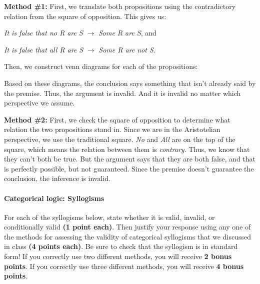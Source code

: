 \documentclass[10pt]{article}
\begin{document}
\begin{enumerate}
   \textbf{Method \#1:} First, we translate both propositions using the contradictory relation from the square of opposition. This gives us: 
  
  \textit{It is false that no R are S} $\rightarrow$ \textit{Some R are S}, and 
  
  \textit{It is false that all R are S} $\rightarrow$ \textit{Some R are not S}.
  
  Then, we construct venn diagrams for each of the propositions:
  
  \begin{center}
  \end{center}

  Based on these diagrams, the conclusion says something that isn't already said by the premise.  Thus, the argument is invalid.  And it is invalid no matter which perspective we assume.
  
  \textbf{Method \#2:} First, we check the square of opposition to determine what relation the two propositions stand in.  Since we are in the Aristotelian perspective, we use the traditional square. \textit{No} and \textit{All} are on the top of the square, which means the relation between them is \textit{contrary}.  Thus, we know that they can't both be true. But the argument says that they are both false, and that is perfectly possible, but not guaranteed.  Since the premise doesn't guarantee the conclusion, the inference is invalid.
  \vspace{2mm}
  

\newpage

\paragraph{Categorical logic: Syllogisms}

For each of the syllogisms below, state whether it is valid, invalid, or conditionally valid \textbf{(1 point each)}. Then justify your response using any one of the methods for assessing the validity of categorical syllogisms that we discussed in class \textbf{(4 points each)}. Be sure to check that the syllogism is in standard form! If you correctly use two different methods, you will receive \textbf{2 bonus points}.  If you correctly use three different methods, you will receive \textbf{4 bonus points}.


\end{enumerate}
\end{document}
